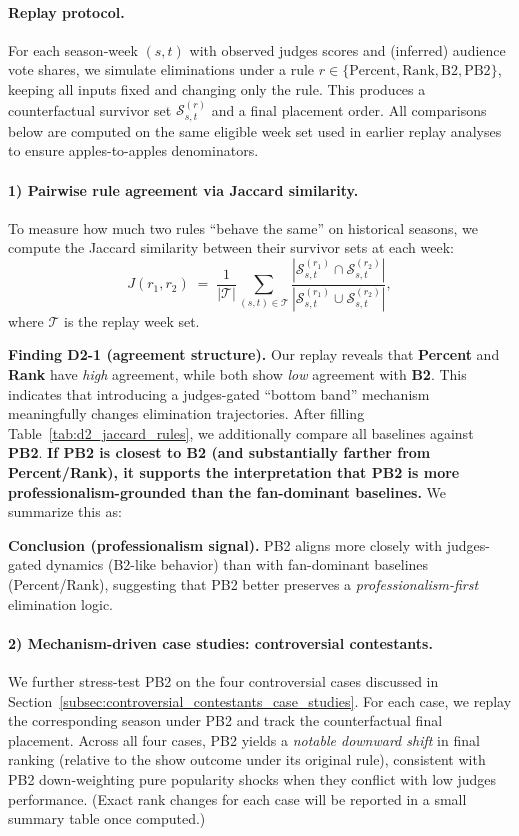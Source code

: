 \paragraph{Replay protocol.}
For each season-week $(s,t)$ with observed judges scores and (inferred) audience vote shares, we simulate eliminations
under a rule $r \in \{\text{Percent}, \text{Rank}, \text{B2}, \text{PB2}\}$, keeping all inputs fixed and changing only the rule.
This produces a counterfactual survivor set $\mathcal{S}^{(r)}_{s,t}$ and a final placement order.
All comparisons below are computed on the same eligible week set used in earlier replay analyses to ensure
apples-to-apples denominators.

\paragraph{1) Pairwise rule agreement via Jaccard similarity.}
To measure how much two rules ``behave the same'' on historical seasons, we compute the Jaccard similarity between
their survivor sets at each week:
\begin{equation}\label{eq:jaccard_similarity}
J\!\left(r_1,r_2\right)
\;=\;
\frac{1}{|\mathcal{T}|}\sum_{(s,t)\in\mathcal{T}}
\frac{\left|\mathcal{S}^{(r_1)}_{s,t}\cap \mathcal{S}^{(r_2)}_{s,t}\right|}
{\left|\mathcal{S}^{(r_1)}_{s,t}\cup \mathcal{S}^{(r_2)}_{s,t}\right|},
\end{equation}
where $\mathcal{T}$ is the replay week set.


\noindent
\textbf{Finding D2-1 (agreement structure).}
Our replay reveals that \textbf{Percent} and \textbf{Rank} have \emph{high} agreement, while both show \emph{low} agreement with
\textbf{B2}. This indicates that introducing a judges-gated ``bottom band'' mechanism meaningfully changes elimination trajectories.
After filling Table~\ref{tab:d2_jaccard_rules}, we additionally compare all baselines against \textbf{PB2}.
\textbf{If PB2 is closest to B2 (and substantially farther from Percent/Rank), it supports the interpretation that PB2 is more
professionalism-grounded than the fan-dominant baselines.}
We summarize this as:

\textbf{Conclusion (professionalism signal).}
PB2 aligns more closely with judges-gated dynamics (B2-like behavior) than with fan-dominant baselines (Percent/Rank),
suggesting that PB2 better preserves a \emph{professionalism-first} elimination logic.


\paragraph{2) Mechanism-driven case studies: controversial contestants.}
We further stress-test PB2 on the four controversial cases discussed in
Section~\ref{subsec:controversial_contestants_case_studies}.
For each case, we replay the corresponding season under PB2 and track the counterfactual final placement.
Across all four cases, PB2 yields a \emph{notable downward shift} in final ranking (relative to the show outcome under its original rule),
consistent with PB2 down-weighting pure popularity shocks when they conflict with low judges performance.
(Exact rank changes for each case will be reported in a small summary table once computed.)

